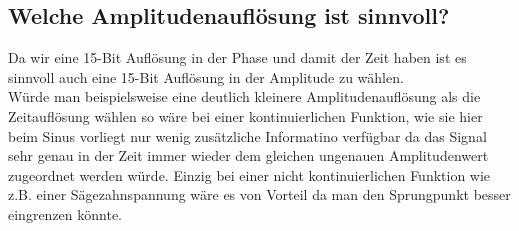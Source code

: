 \documentclass[a4paper,11pt,DIV=11,parskip=half]{scrartcl}
\begin{document}
\subsection{Welche Amplitudenauflösung ist sinnvoll?}
Da wir eine 15-Bit Auflösung in der Phase und damit der Zeit haben ist es sinnvoll auch eine 15-Bit Auflösung in der Amplitude zu wählen. \\
Würde man beispielsweise eine deutlich kleinere Amplitudenauflösung als die Zeitauflösung wählen so wäre bei einer kontinuierlichen Funktion, wie sie hier beim Sinus vorliegt nur wenig zusätzliche Informatino verfügbar da das Signal sehr genau in der Zeit immer wieder dem gleichen ungenauen Amplitudenwert zugeordnet werden würde.
Einzig bei einer nicht kontinuierlichen Funktion wie z.B. einer Sägezahnspannung wäre es von Vorteil da man den Sprungpunkt besser eingrenzen könnte. 




\end{document}
